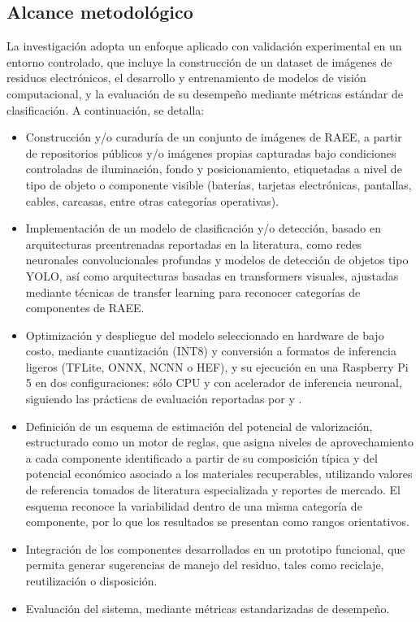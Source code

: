 \subsection{Alcance metodológico}
La investigación adopta un enfoque aplicado con validación experimental en un entorno controlado, que incluye la construcción de un dataset de imágenes de residuos electrónicos, el desarrollo y entrenamiento de modelos de visión computacional, y la evaluación de su desempeño mediante métricas estándar de clasificación. A continuación, se detalla:

\begin{itemize}
    \item Construcción y/o curaduría de un conjunto de imágenes de RAEE, a partir de repositorios públicos y/o imágenes propias capturadas bajo condiciones controladas de iluminación, fondo y posicionamiento, etiquetadas a nivel de tipo de objeto o componente visible (baterías, tarjetas electrónicas, pantallas, cables, carcasas, entre otras categorías operativas).
    \item Implementación de un modelo de clasificación y/o detección, basado en arquitecturas preentrenadas reportadas en la literatura, como redes neuronales convolucionales profundas y modelos de detección de objetos tipo YOLO, así como arquitecturas basadas en transformers visuales, ajustadas mediante técnicas de transfer learning para reconocer categorías de componentes de RAEE.
    \item Optimización y despliegue del modelo seleccionado en hardware de bajo costo, mediante cuantización (INT8) y conversión a formatos de inferencia ligeros (TFLite, ONNX, NCNN o HEF), y su ejecución en una Raspberry Pi 5 en dos configuraciones: sólo CPU y con acelerador de inferencia neuronal, siguiendo las prácticas de evaluación reportadas por \cite{zagitovComparativeAnalysisNeural2024} y \cite{alqahtaniBenchmarkingDeepLearning2024}.
    \item Definición de un esquema de estimación del potencial de valorización, estructurado como un motor de reglas, que asigna niveles de aprovechamiento a cada componente identificado a partir de su composición típica y del potencial económico asociado a los materiales recuperables, utilizando valores de referencia tomados de literatura especializada y reportes de mercado. El esquema reconoce la variabilidad dentro de una misma categoría de componente, por lo que los resultados se presentan como rangos orientativos.
    \item Integración de los componentes desarrollados en un prototipo funcional, que permita generar sugerencias de manejo del residuo, tales como reciclaje, reutilización o disposición.
    \item Evaluación del sistema, mediante métricas estandarizadas de desempeño.
\end{itemize}

